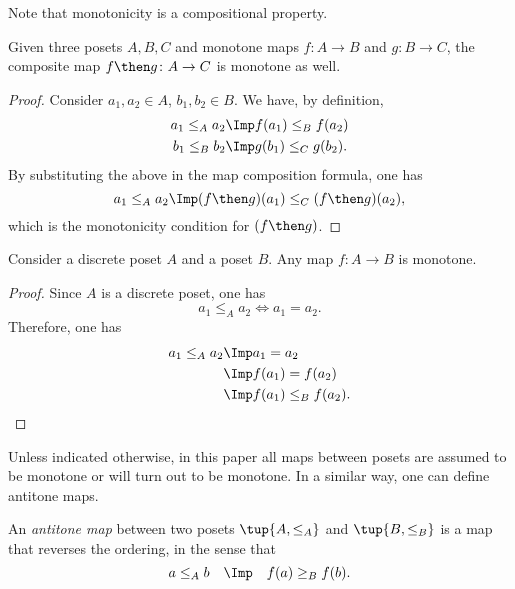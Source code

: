\noindent Note that monotonicity is a compositional property.

\begin{lemma}Given three posets $A, B, C$ and monotone maps $f\colon A
\to B$ and  $g\colon B \to C$, the composite map $f\then g\colon  A \to C$ is
monotone as well.
\end{lemma}
\begin{proof}
Consider $a_1,a_2 \in A$, $b_1,b_2\in B$. We have, by definition, 
\begin{equation}
\begin{aligned}
        a_1\leq_A a_2 &\Imp f(a_1)\leq_B f(a_2)\\ 
        b_1\leq_B b_2 &\Imp g(b_1)\leq_C g(b_2).
\end{aligned}
\end{equation}
By substituting the above in the map composition formula, one has
\begin{equation}
    a_1\leq_A a_2 \Imp (f\then g)(a_1) \leq_C (f\then g)(a_2),
\end{equation}
which is the monotonicity condition for $(f\then g)$.
\end{proof}

\begin{lemma}
Consider a discrete poset $A$ and a poset $B$. Any map $f\colon A\to B$ is monotone.
\end{lemma}
\begin{proof}
Since $A$ is a discrete poset, one has
\begin{equation}
    a_1\leq_A a_2 \iff a_1=a_2.
\end{equation}
Therefore, one has
\begin{equation}
\begin{aligned}
    a_1\leq_A a_2 &\Imp a_1=a_2\\
    &\Imp f(a_1)=f(a_2)\\
    &\Imp f(a_1)\leq_B f(a_2).
\end{aligned}
\end{equation}
\end{proof}
Unless indicated otherwise, in this paper all maps between posets
are assumed to be monotone or will turn out to be monotone. In a similar way, one can define antitone maps.
\begin{definition}
An \emph{antitone map} between two posets
$\tup{A, \leq_A}$ and $\tup{B, \leq_B}$ is a map that reverses the ordering, in the sense that 
\begin{equation}
 a \leq_A b \quad \Imp \quad f(a) \geq_B f(b).
\end{equation}
\end{definition}

